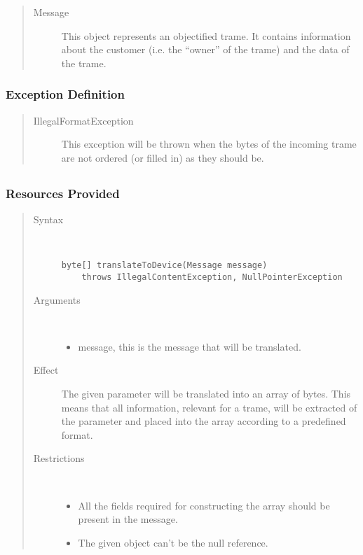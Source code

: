 \begin{quote}
	\begin{description}
		\item[Message] This object represents an objectified trame. It contains
		information about the customer (i.e. the ``owner'' of the trame) and the data
		of the trame.
	\end{description} 
\end{quote}

\subsubsection{Exception Definition} 

\begin{quote}
	\begin{description}
		\item[IllegalFormatException] This exception will be thrown when the bytes of
		the incoming trame are not ordered (or filled in) as they should be.
	\end{description} 
\end{quote}

\subsection{}

\subsubsection{Resources Provided}

\begin{quote}
	\begin{description}
		\item[Syntax] \
		\begin{verbatim}
byte[] translateToDevice(Message message)
    throws IllegalContentException, NullPointerException
		\end{verbatim}
		\item[Arguments] \
		\begin{itemize}
		  \item message, this is the message that will be translated.
		\end{itemize}
		\item[Effect] The given parameter will be translated into an array of bytes.
		This means that all information, relevant for a trame, will be extracted of
		the parameter and placed into the array according to a predefined format.
		\item[Restrictions] \
		\begin{itemize}
		  \item All the fields required for constructing the array should be present
		  in the message.
		  \item The given object can't be the null reference.
		\end{itemize}
	\end{description} 
\end{quote}

